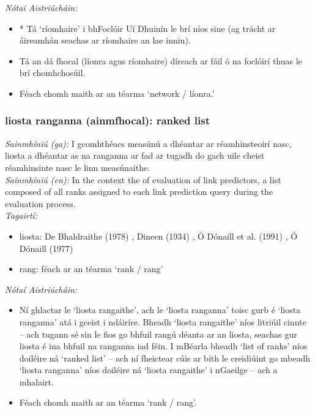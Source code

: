  \noindent \textit{Nótaí Aistriúcháin:}
\begin{itemize}
	\item * Tá `ríomhaire' i bhFoclóir Uí Dhuinín le brí níos sine (ag trácht ar áireamhán seachas ar ríomhaire an lae inniu).
	\item Tá an dá fhocal (líonra agus ríomhaire) díreach ar fáil ó na foclóirí thuas le brí chomhchosúil.
	\item Féach chomh maith ar an téarma `network / líonra.'
\end{itemize}


\subsubsection*{liosta ranganna (ainmfhocal): ranked list}
 \noindent \textit{Sainmhíniú (ga):} I gcomhthéacs measúnú a dhéantar ar réamhinsteoirí nasc, liosta a dhéantar as na ranganna ar fad ar tugadh do gach uile cheist réamhinsinte nasc le linn measúnaithe.
\\
 \noindent \textit{Sainmhíniú (en):} In the context the of evaluation of link predictors, a list composed of all ranks assigned to each link prediction query during the evaluation process.
\\
 \noindent \textit{Tagairtí:}
\begin{itemize}
	\item liosta: De Bhaldraithe (1978) \cite{de-bhaldraithe}, Dineen (1934) \cite{dineen}, Ó Dónaill et al. (1991) \cite{focloir-beag}, Ó Dónaill (1977) \cite{odonaill}
	\item rang: féach ar an téarma `rank / rang'
\end{itemize}

 \noindent \textit{Nótaí Aistriúcháin:}
\begin{itemize}
	\item Ní ghlactar le `liosta rangaithe', ach le `liosta ranganna' toisc gurb é `liosta ranganna' atá i gceist i ndáiríre. Bheadh `liosta rangaithe' níos litriúil cinnte -- ach tugann sé sin le fios go bhfuil rangú déanta ar an liosta, seachas gur liosta é ina bhfuil na ranganna iad féin. I mBéarla  bheadh `list of ranks' níos doiléire ná `ranked list' -- ach ní fheictear cúis ar bith le creidiúint go mbeadh `liosta ranganna' níos doiléire ná `liosta rangaithe' i nGaeilge -- ach a mhalairt.
	\item Féach chomh maith ar an téarma `rank / rang'.
\end{itemize}


